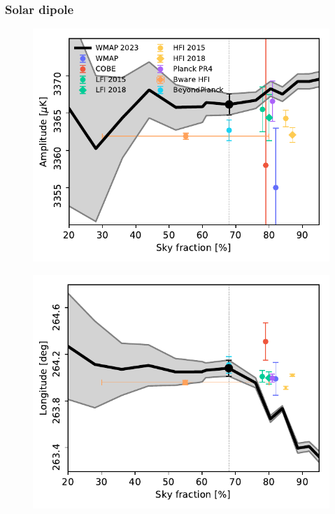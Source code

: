 \documentclass[twocolumn]{../../common/aa}
\begin{document}
\subsubsection{Solar dipole}
\label{sec:dipole}

\begin{figure}
	\includegraphics[width=\columnwidth]{figures/dip_amplitude.pdf}
\end{figure}
\begin{figure}
	\includegraphics[width=\columnwidth]{figures/dip_longitude.pdf}
\end{figure}
\end{document}
